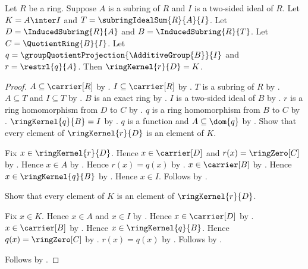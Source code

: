 \begin{theorem}\label{ring_second_isomorphism_restriction_kernel}
    Let $R$ be a ring.
    Suppose $A$ is a subring of $R$ and
        $I$ is a two-sided ideal of $R$.
    Let $K=A\inter I$ and $T=\subringIdealSum{R}{A}{I}$.
    Let $D=\InducedSubring{R}{A}$ and $B=\InducedSubring{R}{T}$.
    Let $C=\QuotientRing{B}{I}$.
    Let $q=\groupQuotientProjection{\AdditiveGroup{B}}{I}$ and
        $r=\restrl{q}{A}$.
    Then $\ringKernel{r}{D}=K$.
\end{theorem}
\begin{proof}
    $A\subseteq\carrier[R]$ by .
    $I\subseteq\carrier[R]$ by
        .
    $T$ is a subring of $R$ by .
    $A\subseteq T$ and $I\subseteq T$ by
        .
    $B$ is an exact ring by .
    $I$ is a two-sided ideal of $B$ by
        .
    $r$ is a ring homomorphism from $D$ to $C$ by
        .
    $q$ is a ring homomorphism from $B$ to $C$ by
        .
    $\ringKernel{q}{B}=I$ by
        .
    $q$ is a function and $A\subseteq\dom{q}$ by
        .
    Show that every element of $\ringKernel{r}{D}$ is an element
        of $K$.
    \begin{subproof}
        Fix $x\in\ringKernel{r}{D}$.
        Hence $x\in\carrier[D]$ and $r(x)=\ringZero[C]$ by
            .
        Hence $x\in A$ by .
        Hence $r(x)=q(x)$ by .
        $x\in\carrier[B]$ by
            .
        Hence $x\in\ringKernel{q}{B}$ by
            .
        Hence $x\in I$.
        Follows by .
    \end{subproof}
    Show that every element of $K$ is an element of
        $\ringKernel{r}{D}$.
    \begin{subproof}
        Fix $x\in K$.
        Hence $x\in A$ and $x\in I$ by
            .
        Hence $x\in\carrier[D]$ by .
        $x\in\carrier[B]$ by
            .
        Hence $x\in\ringKernel{q}{B}$.
        Hence $q(x)=\ringZero[C]$ by .
        $r(x)=q(x)$ by .
        Follows by .
    \end{subproof}
    Follows by .
\end{proof}

